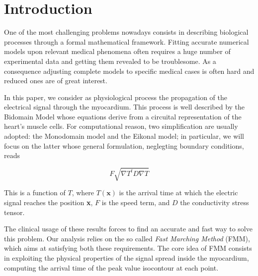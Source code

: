 \documentclass[11pt,a4paper]{article}
\begin{document}



\section{Introduction} \label{sec:introduction}

    One of the most challenging problems nowadays consists in describing biological processes through a formal mathematical framework. Fitting accurate numerical models upon relevant medical phenomena often requires a huge number of experimental data and getting them revealed to be troublesome. As a consequence adjusting complete models to specific medical cases is often hard and reduced ones are of great interest.

    In this paper, we consider as physiological process the propagation of the electrical signal through the myocardium. This process is well described by the Bidomain Model whose equations derive from a circuital representation of the heart's muscle cells. For computational reason, two simplification are usually adopted: the Monodomain model and the Eikonal model; in particular, we will focus on the latter whose general formulation, neglegting boundary conditions, reads
    
    $$ F\sqrt{\nabla T ^t D \nabla T} $$

    This is a function of $T$, where $T(\textbf{x})$ is the arrival time at which the electric signal reaches the position \textbf{x}, $F$ is the speed term, and $D$ the conductivity stress tensor.

    The clinical usage of these results forces to find an accurate and fast way to solve this problem. Our analysis relies on the so called \textit{Fast Marching Method} (FMM), which aims at satisfying both these requirements. The core idea of FMM consists in exploiting the physical properties of the signal spread inside the myocardium, computing the arrival time of the peak value isocontour at each point.
\end{document}
